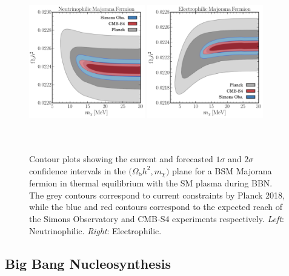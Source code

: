 \documentclass[notitlepage,letterpaper,natbib,aps,prd,onecolumn,amsmath,amsfonts,nofootinbib,preprintnumbers,superscriptaddress,secnumarabic,groupedaddress]{revtex4-1}
\begin{document}
\begin{figure}[t]
    \centering
    \includegraphics[width=0.45\textwidth,height=200pt]{figures/Nu_Maj_cmb_exclusion.pdf} \qquad
    \includegraphics[width=0.45\textwidth,height=200pt]{figures/EE_Maj_cmb_exclusion.pdf}
    \caption{Contour plots showing the current and forecasted $1\sigma$ and $2\sigma$ confidence intervals in the $(\Omega_\mathrm{b} h^2$,\,$m_\chi)$ plane for a BSM Majorana fermion in thermal equilibrium with the SM plasma during BBN. The grey contours correspond to current constraints by Planck 2018, while the blue and red contours correspond to the expected reach of the Simons Observatory and CMB-S4 experiments respectively. \emph{Left}: Neutrinophilic. \emph{Right}: Electrophilic.}
    \label{fig:Future_1-2D}
\end{figure}


\subsection{Big Bang Nucleosynthesis}\label{sec:future_BBN}
\end{document}
